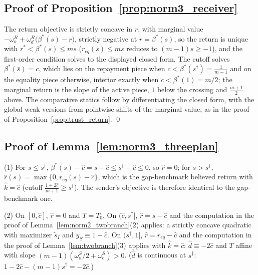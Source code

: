 \documentclass[11pt]{article}
\theoremstyle{plain}
\theoremstyle{remark}
\begin{document}
\iffalse
\subsection*{Proof of Proposition~\ref{prop:norm3_receiver}}

The return objective is strictly concave in $r$, with marginal value $-\omega_o^{R}+\omega_d^{R}\big(\beta^\ast(s)-r\big)$, strictly negative at $r=\beta^\ast(s)$, so the return is unique with $r^\ast<\beta^\ast(s)\le ms$ ($r_{eq}(s)\le ms$ reduces to $(m-1)s\ge-1$), and the first-order condition solves to the displayed closed form.  The cutoff solves $\beta^\ast(\bar s)=c$, which lies on the repayment piece when $c<\beta^\ast(s^\dagger)=\frac1{m-1}$ and on the equality piece otherwise, interior exactly when $c<\beta^\ast(1)=m/2$; the marginal return is the slope of the active piece, $1$ below the crossing and $\frac{m+1}2$ above.  The comparative statics follow by differentiating the closed form, with the global weak versions from pointwise shifts of the marginal value, as in the proof of Proposition~\ref{prop:trust_return}.
\qed

\subsection*{Proof of Lemma~\ref{lem:norm3_threeplan}}

(1) For $s\le s^\dagger$, $\beta^\ast(s)-\hat c=s-\hat c\le s^\dagger-\hat c\le0$, so $\hat r=0$; for $s>s^\dagger$, $\hat r(s)=\max\{0,r_{eq}(s)-\hat c\}$, which is the gap-benchmark believed return with $\hat k=\hat c$ (cutoff $\frac{1+2\hat c}{m+1}\ge s^\dagger$).  The sender's objective is therefore identical to the gap-benchmark one.

(2) On $[0,\hat c]$, $\hat r=0$ and $T=T_0$.  On $(\hat c,s^\dagger]$, $\hat r=s-\hat c$ and the computation in the proof of Lemma~\ref{lem:norm2_twobranch}(2) applies: a strictly concave quadratic with maximizer $\tilde s_I$ and $\hat y_S\equiv1-\hat c$.  On $(s^\dagger,1]$, $\hat r=r_{eq}-\hat c$ and the computation in the proof of Lemma~\ref{lem:twobranch}(3) applies with $\hat k=\hat c$: $\hat d\equiv-2\hat c$ and $T$ affine with slope $(m-1)(\omega_o^S/2+\omega_e^S)>0$.  ($\hat d$ is continuous at $s^\dagger$: $1-2\hat c-(m-1)s^\dagger=-2\hat c$.)
\end{document}
